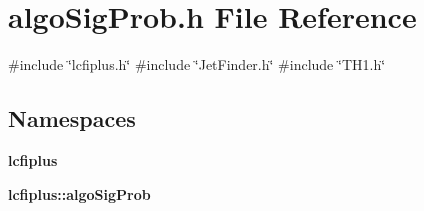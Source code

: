 \section{algo\+Sig\+Prob.\+h File Reference}
\label{algoSigProb_8h}
{\ttfamily \#include \char`\"{}lcfiplus.\+h\char`\"{}}\newline
{\ttfamily \#include \char`\"{}Jet\+Finder.\+h\char`\"{}}\newline
{\ttfamily \#include \char`\"{}T\+H1.\+h\char`\"{}}\newline
\subsection*{Namespaces}
\begin{DoxyCompactItemize}
\item 
 \textbf{ lcfiplus}
\item 
 \textbf{ lcfiplus\+::algo\+Sig\+Prob}
\end{DoxyCompactItemize}
